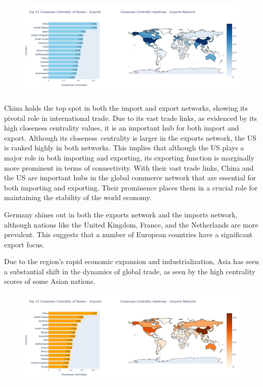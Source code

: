 \documentclass[12pt, a4paper]{article}
\begin{document}
\begin{figure}[ht]
\centering
\includegraphics[width=\textwidth]{img/exportclose.png}
\label{fig:exportclose}
\end{figure}
China holds the top spot in both the import and export networks, showing its pivotal role in international trade. Due to its vast trade links, as evidenced by its high closeness centrality values, it is an important hub for both import and export. Although its closeness centrality is larger in the exports network, the US is ranked highly in both networks. This implies that although the US plays a major role in both importing and exporting, its exporting function is marginally more prominent in terms of connectivity. With their vast trade links, China and the US are important hubs in the global commerce network that are essential for both importing and exporting. Their prominence places them in a crucial role for maintaining the stability of the world economy.

Germany shines out in both the exports network and the imports network, although nations like the United Kingdom, France, and the Netherlands are more prevalent. This suggests that a number of European countries have a significant export focus.

Due to the region's rapid economic expansion and industrialization, Asia has seen a substantial shift in the dynamics of global trade, as seen by the high centrality scores of some Asian nations.

\begin{figure}[ht]
\centering
\includegraphics[width=\textwidth]{img/importclose.png}
\label{fig:importclose}
\end{figure}
\end{document}
